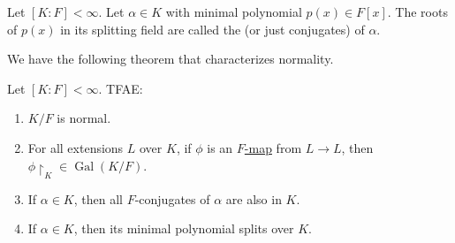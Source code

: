 \documentclass[notoc,notitlepage,nobib]{tufte-book}
\DeclareMathOperator{\Gal}{Gal}
\begin{document}
\begin{defn}[$F$-conjugates]\label{defn:_f_conjugates}
  Let $[ K : F ] < \infty$. Let $\alpha \in K$ with minimal polynomial $p(x) \in
  F[x]$. The roots of $p(x)$ in its splitting field are called the
   (or just conjugates) of $\alpha$.
\end{defn}

We have the following theorem that characterizes normality.

\begin{thm}\label{thm:normality_theorem}
  Let $[ K : F ] < \infty$. TFAE:
  \begin{enumerate}
    \item $K / F$ is normal.
    \item For all extensions $L$ over $K$, if $\phi$ is an
      \hyperref[defn:_f_map]{$F$-map} from $L \to L$, then $\phi \restriction_K
      \in \Gal(K / F)$.
    \item If $\alpha \in K$, then all $F$-conjugates of $\alpha$ are also in
      $K$.
    \item If $\alpha \in K$, then its minimal polynomial splits over $K$.
  \end{enumerate}
\end{thm}
\end{document}
